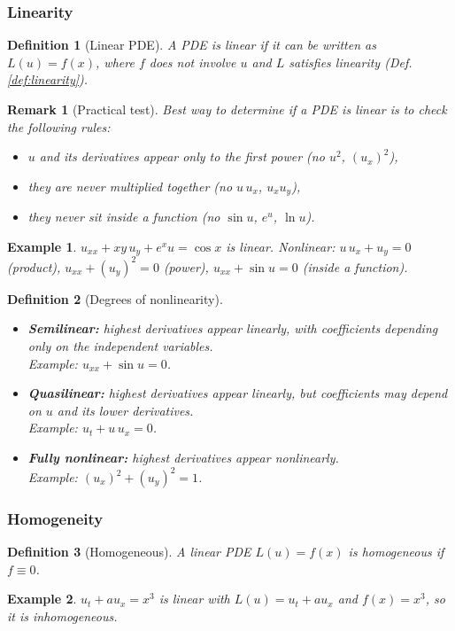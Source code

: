 \documentclass{article}
\newtheorem{definition}{Definition}
\newtheorem*{example}{Example}
\newtheorem{remark}{Remark}
\begin{document}
\subsubsection{Linearity}
\begin{definition}[Linear PDE]
    A PDE is linear if it can be written as $L(u) = f(x)$, where $f$ does not involve $u$ and $L$ satisfies linearity (Def.\ref{def:linearity}).
\end{definition}
\begin{remark}[Practical test]
    Best way to determine if a PDE is linear is to check the following rules:
    \begin{itemize}
        \item $u$ and its derivatives appear only to the first power (no $u^2$, $(u_x)^2$),
        \item they are never multiplied together (no $u\,u_x$, $u_x u_y$),
        \item they never sit inside a function (no $\sin u$, $e^u$, $\ln u$).
    \end{itemize}
\end{remark}
\begin{example}
    $u_{xx} + xy\,u_y + e^x u = \cos x$ is linear. Nonlinear: $u\,u_x + u_y = 0$ (product), $u_{xx} + (u_y)^2 = 0$ (power), $u_{xx} + \sin u = 0$ (inside a function).
\end{example}
\begin{definition}[Degrees of nonlinearity]\leavevmode
    \begin{itemize}
        \item \textbf{Semilinear:} highest derivatives appear linearly, with coefficients depending only on the independent variables.\\Example: $u_{xx} + \sin u = 0$.
        \item \textbf{Quasilinear:} highest derivatives appear linearly, but coefficients may depend on $u$ and its lower derivatives.\\Example: $u_t + u\,u_x = 0$.
        \item \textbf{Fully nonlinear:} highest derivatives appear nonlinearly.\\Example: $(u_x)^2 + (u_y)^2 = 1$.
    \end{itemize}
\end{definition}

\subsubsection{Homogeneity}
\begin{definition}[Homogeneous]
    A linear PDE $L(u) = f(x)$ is homogeneous if $f \equiv 0$.
\end{definition}
\begin{example}
    $u_t + a u_x = x^3$ is linear with $L(u) = u_t + a u_x$ and $f(x) = x^3$, so it is inhomogeneous.
\end{example}
\end{document}
